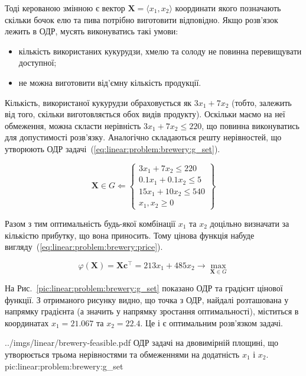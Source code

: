 \documentclass[\main/book.tex]{subfiles}
\begin{document}
Тоді керованою змінною є вектор $\mathbf{X} = \langle x_1, x_2 \rangle$ координати якого позначають скільки бочок елю та пива потрібно виготовити відповідно. Якщо розв'язок лежить в ОДР, мусять виконуватись такі умови:

\begin{itemize}
 \item кількість використаних кукурудзи, хмелю та солоду не повинна перевищувати доступної;
 \item не можна виготовити від'ємну кількість продукції.
\end{itemize}

Кількість, використаної кукурудзи обраховується як ${3 x_1 + 7 x_2}$ (тобто, залежить від того, скільки виготовляється обох видів продукту). Оскільки маємо на неї обмеження, можна скласти нерівність ${3 x_1 + 7 x_2 \leq 220}$, що повинна виконуватись для допустимості розв'язку. Аналогічно складаються решту нерівностей, що утворюють ОДР задачі~(\ref{eq:linear:problem:brewery:g_set}).

\begin{equation}
 \mathbf{X} \in G \Leftarrow \left\{\begin{array}{l}
    3 x_1 + 7 x_2 \leq 220 \\
    0.1 x_1 + 0.1 x_2 \leq 5 \\
    15 x_1 + 10 x_2 \leq 540 \\
    x_1, x_2 \geq 0
 \end{array}\right\}
 \label{eq:linear:problem:brewery:g_set}
\end{equation}

Разом з тим оптимальність будь-якої комбінації $x_1$ та $x_2$ доцільно визначати за кількістю прибутку, що вона приносить. Тому цінова функція набуде вигляду~(\ref{eq:linear:problem:brewery:price}).

\begin{equation}
 \varphi(\mathbf{X}) =
 \mathbf{X} \mathbf{c}^\top =
 213 x_1 + 485 x_2
 \rightarrow \max_{\mathbf{X} \in G}
 \label{eq:linear:problem:brewery:price}
\end{equation}

На Рис.~\ref{pic:linear:problem:brewery:g_set} показано ОДР та градієнт цінової функції. З отриманого рисунку видно, що точка з ОДР, найдалі розташована у напрямку градієнта (а значить у напрямку зростання оптимальності), міститься в координатах $x_1 = 21.067$ та $x_2 = 22.4$. Це і є оптимальним розв'язком задачі.

\illustration
 {../imgs/linear/brewery-feasible.pdf}
 {ОДР задачі на двовимірній площині, що утворюється трьома нерівностями та обмеженнями на додатність $x_1$ і $x_2$.}
 {pic:linear:problem:brewery:g_set}
 
\end{document}
